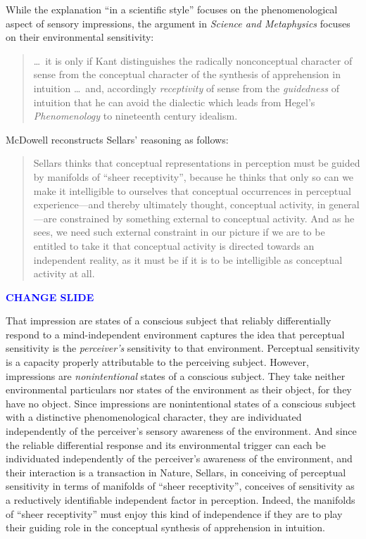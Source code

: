 \documentclass[12pt]{article}
\newcommand{\change}{\textcolor{blue}{\textbf{CHANGE SLIDE}}}
\begin{document}
While the explanation ``in a scientific style'' focuses on the phenomenological aspect of sensory impressions, the argument in \emph{Science and Metaphysics} focuses on their environmental sensitivity:
\begin{quote}
    \ldots\ it is only if Kant distinguishes the radically nonconceptual character of sense from the conceptual character of the synthesis of apprehension in intuition \ldots\ and, accordingly \emph{receptivity} of sense from the \emph{guidedness} of intuition that he can avoid the dialectic which leads from Hegel's \emph{Phenomenology} to nineteenth century idealism.
\end{quote}
McDowell reconstructs Sellars' reasoning as follows:
\begin{quote}
    Sellars thinks that conceptual representations in perception must be guided by manifolds of ``sheer receptivity'', because he thinks that only so can we make it intelligible to ourselves that conceptual occurrences in perceptual experience---and thereby ultimately thought, conceptual activity, in general---are constrained by something external to conceptual activity. And as he sees, we need such external constraint in our picture if we are to be entitled to take it that conceptual activity is directed towards an independent reality, as it must be if it is to be intelligible as conceptual activity at all.
\end{quote}

\change

That impression are states of a conscious subject that reliably differentially respond to a mind-independent environment captures the idea that perceptual sensitivity is the \emph{perceiver's} sensitivity to that environment. Perceptual sensitivity is a capacity properly attributable to the perceiving subject. However, impressions are \emph{nonintentional} states of a conscious subject. They take neither environmental particulars nor states of the environment as their object, for they have no object. Since impressions are nonintentional states of a conscious subject with a distinctive phenomenological character, they are individuated independently of the perceiver's sensory awareness of the environment. And since the reliable differential response and its environmental trigger can each be individuated independently of the perceiver's awareness of the environment, and their interaction is a transaction in Nature, Sellars, in conceiving of perceptual sensitivity in terms of manifolds of ``sheer receptivity'', conceives of sensitivity as a reductively identifiable independent factor in perception.  Indeed, the manifolds of ``sheer receptivity'' must enjoy this kind of independence if they are to play their guiding role in the conceptual synthesis of apprehension in intuition.
\end{document}
